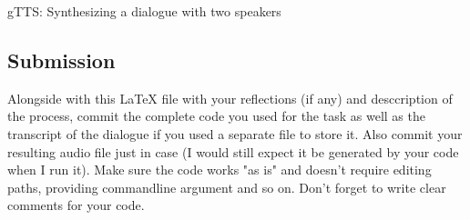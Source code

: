 \documentclass{../labbook}
\begin{document}
\begin{problem}{1}{10}{gTTS: Synthesizing a dialogue with two speakers}
\begin{enumerate}
\end{enumerate}
\subsection*{Submission}
\noindent Alongside with this LaTeX file with your reflections (if any) and desccription of the process, commit the complete code you used for the task as well as the transcript of the dialogue if you used a separate file to store it. Also commit your resulting audio file just in case (I would still expect it be generated by your code when I run it). 
Make sure the code works "as is" and doesn't require editing paths, providing commandline argument and so on. Don't forget to write clear comments for your code.

\end{problem}
\end{document}
